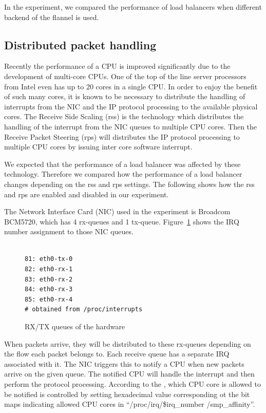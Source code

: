 In the experiment, we compared the performance of load balancers when different backend of the flannel is used. 

\subsection{Distributed packet handling}

Recently the performance of a CPU is improved significantly due to the development of multi-core CPUs.
One of the top of the line server processors from Intel even has up to 20 cores in a single CPU.
In order to enjoy the benefit of such many cores, 
it is known to be necessary to distribute the handling of interrupts from the NIC and the IP protocol processing
to the available physical cores.
The Receive Side Scaling (rss)\cite{TomHerbert} is the technology 
which distributes the handling of the interrupt from the NIC queues to multiple CPU cores.
Then the Receive Packet Steering (rps)\cite{TomHerbert} will distributes the IP protocol processing 
to multiple CPU cores by issuing inter core software interrupt.

We expected that the performance of a load balancer was affected  by these technology.
Therefore we compared how the performance of a load balancer changes depending on the rss and rps settings.
The following shows how the rss and rps are enabled and disabled in our experiment. 

The Network Interface Card (NIC) used in the experiment is Broadcom BCM5720, which has 4 rx-queues and 1 tx-queue.
Figure~\ref{fig:rx-queue} shows  the IRQ number assignment to those NIC queues.
 
\begin{figure}
\begin{minipage}{0.8\columnwidth}
\small
\begin{verbatim}

81: eth0-tx-0
82: eth0-rx-1
83: eth0-rx-2
84: eth0-rx-3
85: eth0-rx-4
# obtained from /proc/interrupts 

\end{verbatim}
\end{minipage}
\caption{RX/TX queues of the hardware}
\label{fig:rx-queue}
\end{figure}

When packets arrive, they will be distributed to these rx-queues depending on the flow each packet belongs to.
Each receive queue has a separate IRQ associated with it. The NIC triggers
this to notify a CPU when new packets arrive on the given queue.
The notified CPU will handle the interrupt and then perform the protocol processing. 
According to the \cite{TomHerbert}, which CPU core is allowed to be notified is controlled by setting 
hexadecimal value corresponding ot the bit maps indicating allowed CPU cores in \enquote{/proc/irq/\$irq\_number /smp\_affinity}.

